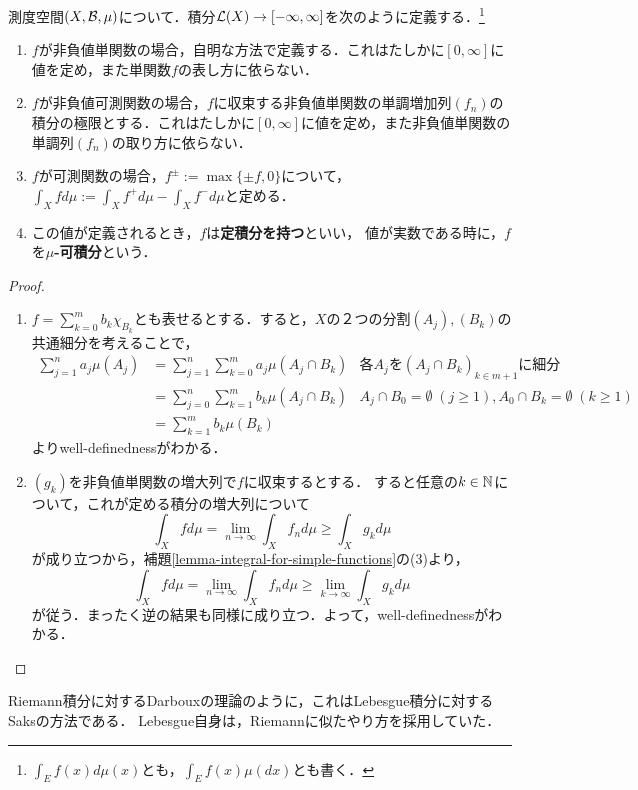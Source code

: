 \documentclass[uplatex, dvipdfmx]{jsreport}
\begin{document}
\begin{definition}[integrable]
    測度空間$(X,\mathcal{B},\mu)$について．積分$\mathcal{L}(X)\to[-\infty,\infty]$を次のように定義する．\footnote{$\int_Ef(x)d\mu(x)$とも，$\int_Ef(x)\mu(dx)$とも書く．}
    \begin{enumerate}
        \item $f$が非負値単関数の場合，自明な方法で定義する．これはたしかに$[0,\infty]$に値を定め，また単関数$f$の表し方に依らない．
        \item $f$が非負値可測関数の場合，$f$に収束する非負値単関数の単調増加列$(f_n)$の積分の極限とする．これはたしかに$[0,\infty]$に値を定め，また非負値単関数の単調列$(f_n)$の取り方に依らない．
        \item $f$が可測関数の場合，$f^{\pm}:=\max\{\pm f,0\}$について，$\int_Xfd\mu:=\int_Xf^+d\mu-\int_Xf^-d\mu$と定める．
        \item この値が定義されるとき，$f$は\textbf{定積分を持つ}といい，
        値が実数である時に，$f$を\textbf{$\mu$-可積分}という．
    \end{enumerate}
\end{definition}
\begin{proof}\mbox{}
    \begin{enumerate}
        \item $f=\sum^m_{k=0}b_k\chi_{B_k}$とも表せるとする．すると，$X$の２つの分割$(A_j),(B_k)$の共通細分を考えることで，
        \begin{align*}
            \sum^n_{j=1}a_j\mu(A_j)&=\sum^n_{j=1}\sum^m_{k=0}a_j\mu(A_j\cap B_k)&各A_jを(A_j\cap B_k)_{k\in m+1}に細分\\
            &=\sum^n_{j=0}\sum^m_{k=1}b_k\mu(A_j\cap B_k)&A_j\cap B_0=\emptyset\;(j\ge 1),A_0\cap B_k=\emptyset\;(k\ge 1)\\
            &=\sum^m_{k=1}b_k\mu(B_k)
        \end{align*}
        よりwell-definednessがわかる．
        \item $(g_k)$を非負値単関数の増大列で$f$に収束するとする．
        すると任意の$k\in\mathbb{N}$について，これが定める積分の増大列について
        \[\int_Xfd\mu=\lim_{n\to\infty}\int_Xf_nd\mu\ge\int_Xg_kd\mu\]
        が成り立つから，補題\ref{lemma-integral-for-simple-functions}の(3)より，
        \[\int_Xfd\mu=\lim_{n\to\infty}\int_Xf_nd\mu\ge\lim_{k\to\infty}\int_Xg_kd\mu\]
        が従う．まったく逆の結果も同様に成り立つ．よって，well-definednessがわかる．
    \end{enumerate}
\end{proof}
\begin{history}
    Riemann積分に対するDarbouxの理論のように，これはLebesgue積分に対するSaksの方法である\cite{Saks}．
    Lebesgue自身は，Riemannに似たやり方を採用していた．
\end{history}
\end{document}
